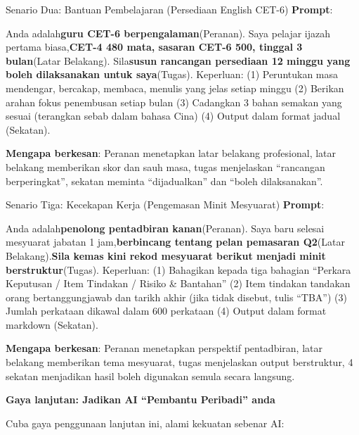 \begin{tcbinfo}{Senario Dua: Bantuan Pembelajaran (Persediaan English CET-6)}
\textbf{Prompt}:

Anda adalah\textbf{guru CET-6 berpengalaman}(Peranan). Saya pelajar ijazah pertama biasa,\textbf{CET-4 480 mata, sasaran CET-6 500, tinggal 3 bulan}(Latar Belakang). Sila\textbf{susun rancangan persediaan 12 minggu yang boleh dilaksanakan untuk saya}(Tugas). Keperluan: (1) Peruntukan masa mendengar, bercakap, membaca, menulis yang jelas setiap minggu (2) Berikan arahan fokus penembusan setiap bulan (3) Cadangkan 3 bahan semakan yang sesuai (terangkan sebab dalam bahasa Cina) (4) Output dalam format jadual (Sekatan).

\textbf{Mengapa berkesan}: Peranan menetapkan latar belakang profesional, latar belakang memberikan skor dan sauh masa, tugas menjelaskan “rancangan berperingkat”, sekatan meminta “dijadualkan” dan “boleh dilaksanakan”.

\end{tcbinfo}

\begin{tcbinfo}{Senario Tiga: Kecekapan Kerja (Pengemasan Minit Mesyuarat)}
\textbf{Prompt}:

Anda adalah\textbf{penolong pentadbiran kanan}(Peranan). Saya baru selesai mesyuarat jabatan 1 jam,\textbf{berbincang tentang pelan pemasaran Q2}(Latar Belakang).\textbf{Sila kemas kini rekod mesyuarat berikut menjadi minit berstruktur}(Tugas). Keperluan: (1) Bahagikan kepada tiga bahagian “Perkara Keputusan / Item Tindakan / Risiko \& Bantahan” (2) Item tindakan tandakan orang bertanggungjawab dan tarikh akhir (jika tidak disebut, tulis “TBA”) (3) Jumlah perkataan dikawal dalam 600 perkataan (4) Output dalam format markdown (Sekatan).

\textbf{Mengapa berkesan}: Peranan menetapkan perspektif pentadbiran, latar belakang memberikan tema mesyuarat, tugas menjelaskan output berstruktur, 4 sekatan menjadikan hasil boleh digunakan semula secara langsung.

\end{tcbinfo}

\textbf{Gaya lanjutan: Jadikan AI “Pembantu Peribadi” anda}\par

Cuba gaya penggunaan lanjutan ini, alami kekuatan sebenar AI:

